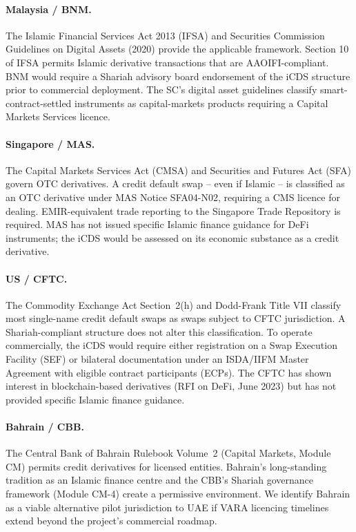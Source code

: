 \documentclass[12pt]{article}
\theoremstyle{plain}
\theoremstyle{definition}
\theoremstyle{remark}
\begin{document}
\paragraph{Malaysia / BNM.}
The Islamic Financial Services Act 2013 (IFSA) and Securities Commission
Guidelines on Digital Assets (2020) provide the applicable framework.
Section 10 of IFSA permits Islamic derivative transactions that are
AAOIFI-compliant.
BNM would require a Shariah advisory board endorsement of the iCDS structure
prior to commercial deployment.
The SC's digital asset guidelines classify smart-contract-settled instruments
as capital-markets products requiring a Capital Markets Services licence.

\paragraph{Singapore / MAS.}
The Capital Markets Services Act (CMSA) and Securities and Futures Act (SFA)
govern OTC derivatives.
A credit default swap -- even if Islamic -- is classified as an OTC derivative
under MAS Notice SFA04-N02, requiring a CMS licence for dealing.
EMIR-equivalent trade reporting to the Singapore Trade Repository is required.
MAS has not issued specific Islamic finance guidance for DeFi instruments;
the iCDS would be assessed on its economic substance as a credit derivative.

\paragraph{US / CFTC.}
The Commodity Exchange Act Section~2(h) and Dodd-Frank Title VII classify
most single-name credit default swaps as swaps subject to CFTC jurisdiction.
A Shariah-compliant structure does not alter this classification.
To operate commercially, the iCDS would require either registration on a
Swap Execution Facility (SEF) or bilateral documentation under an
ISDA/IIFM Master Agreement with eligible contract participants (ECPs).
The CFTC has shown interest in blockchain-based derivatives (RFI on DeFi,
June 2023) but has not provided specific Islamic finance guidance.

\paragraph{Bahrain / CBB.}
The Central Bank of Bahrain Rulebook Volume~2 (Capital Markets, Module CM)
permits credit derivatives for licensed entities.
Bahrain's long-standing tradition as an Islamic finance centre and the CBB's
Shariah governance framework (Module CM-4) create a permissive environment.
We identify Bahrain as a viable alternative pilot jurisdiction to UAE if
VARA licencing timelines extend beyond the project's commercial roadmap.
\end{document}

